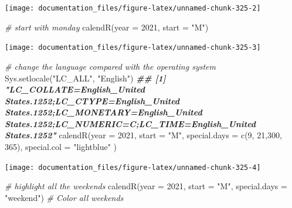 \documentclass[
]{article}
\newenvironment{Shaded}{\begin{snugshade}}{\end{snugshade}}
\newcommand{\AttributeTok}[1]{\textcolor[rgb]{0.77,0.63,0.00}{#1}}
\newcommand{\CommentTok}[1]{\textcolor[rgb]{0.56,0.35,0.01}{\textit{#1}}}
\newcommand{\DecValTok}[1]{\textcolor[rgb]{0.00,0.00,0.81}{#1}}
\newcommand{\DocumentationTok}[1]{\textcolor[rgb]{0.56,0.35,0.01}{\textbf{\textit{#1}}}}
\newcommand{\FunctionTok}[1]{\textcolor[rgb]{0.00,0.00,0.00}{#1}}
\newcommand{\NormalTok}[1]{#1}
\newcommand{\StringTok}[1]{\textcolor[rgb]{0.31,0.60,0.02}{#1}}
\begin{document}
\begin{center}\texttt{[image: documentation\_files/figure-latex/unnamed-chunk-325-2]} \end{center}

\begin{Shaded}
\begin{Highlighting}[]

\CommentTok{\# start with monday}
\FunctionTok{calendR}\NormalTok{(}\AttributeTok{year =} \DecValTok{2021}\NormalTok{, }
        \AttributeTok{start =} \StringTok{"M"}\NormalTok{)}
\end{Highlighting}
\end{Shaded}

\begin{center}\texttt{[image: documentation\_files/figure-latex/unnamed-chunk-325-3]} \end{center}

\begin{Shaded}
\begin{Highlighting}[]

\CommentTok{\# change the language compared with the operating system }
\FunctionTok{Sys.setlocale}\NormalTok{(}\StringTok{"LC\_ALL"}\NormalTok{, }\StringTok{"English"}\NormalTok{)}
\DocumentationTok{\#\# [1] "LC\_COLLATE=English\_United States.1252;LC\_CTYPE=English\_United States.1252;LC\_MONETARY=English\_United States.1252;LC\_NUMERIC=C;LC\_TIME=English\_United States.1252"}
\FunctionTok{calendR}\NormalTok{(}\AttributeTok{year =} \DecValTok{2021}\NormalTok{, }
        \AttributeTok{start =} \StringTok{"M"}\NormalTok{, }
        \AttributeTok{special.days =} \FunctionTok{c}\NormalTok{(}\DecValTok{9}\NormalTok{, }\DecValTok{21}\NormalTok{,}\DecValTok{300}\NormalTok{, }\DecValTok{365}\NormalTok{),}
        \AttributeTok{special.col =} \StringTok{"lightblue"}
\NormalTok{        )}
\end{Highlighting}
\end{Shaded}

\begin{center}\texttt{[image: documentation\_files/figure-latex/unnamed-chunk-325-4]} \end{center}

\begin{Shaded}
\begin{Highlighting}[]

\CommentTok{\# highlight all the weekends}
\FunctionTok{calendR}\NormalTok{(}\AttributeTok{year =} \DecValTok{2021}\NormalTok{,}
        \AttributeTok{start =} \StringTok{"M"}\NormalTok{,}
        \AttributeTok{special.days =} \StringTok{"weekend"}\NormalTok{) }\CommentTok{\# Color all weekends}
\end{Highlighting}
\end{Shaded}
\end{document}
